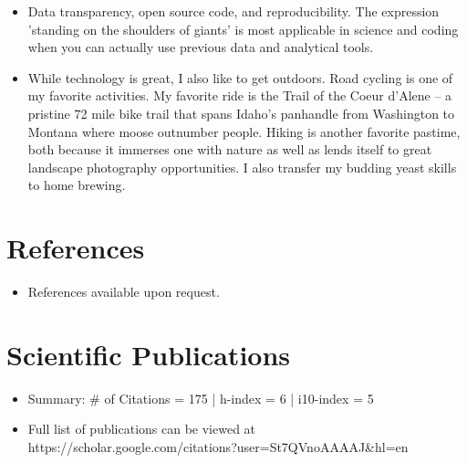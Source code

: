 \documentclass[11pt,a4paper,sans]{moderncv}        %
\begin{document}
\begin{itemize}

\item{Data transparency, open source code, and reproducibility. The expression 'standing on the shoulders of giants' is most applicable in science and coding when you can actually use previous data and analytical tools.}

\vspace{6pt}

\item{While technology is great, I also like to get outdoors. Road cycling is one of my favorite activities. My favorite ride is the Trail of the Coeur d'Alene -- a pristine 72 mile bike trail that spans Idaho's panhandle from Washington to Montana where moose outnumber people. Hiking is another favorite pastime, both because it immerses one with nature as well as lends itself to great landscape photography opportunities. I also transfer my budding yeast skills to home brewing.}



\end{itemize}

\section{References}

\vspace{6pt}
 
\begin{itemize}

\item{References available upon request.}

\end{itemize}

\section{Scientific Publications}

\vspace{6pt}
 
\begin{itemize}

\item{Summary: \# of Citations = 175 |  h-index = 6 | i10-index = 5}
\vspace{6pt}
\item{Full list of publications can be viewed at https://scholar.google.com/citations?user=St7QVnoAAAAJ\&hl=en}


\end{itemize}
\end{document}
